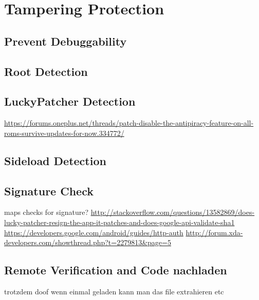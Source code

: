 \section{Tampering Protection} \label{section:tampering}

\subsection{Prevent Debuggability} \label{subsection:tampering-debuggable}
\subsection{Root Detection} \label{subsection:tampering-root}
\subsection{LuckyPatcher Detection} \label{subsection:tampering-luckypatcher}
\url{https://forums.oneplus.net/threads/patch-disable-the-antipiracy-feature-on-all-roms-survive-updates-for-now.334772/}
\subsection{Sideload Detection} \label{subsection:tampering-sideload}
\subsection{Signature Check} \label{subsection:tampering-signature}
maps checks for signature?\newline
\url{http://stackoverflow.com/questions/13582869/does-lucky-patcher-resign-the-app-it-patches-and-does-google-api-validate-sha1}\newline
\url{https://developers.google.com/android/guides/http-auth}
\url{http://forum.xda-developers.com/showthread.php?t=2279813&page=5}\newline
\subsection{Remote Verification and Code nachladen} \label{subsection:external-remote}
trotzdem doof wenn einmal geladen kann man das file extrahieren etc
